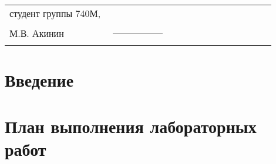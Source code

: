 


\newcommand{\linux}{ОС GNU/Linux}
\newcommand{\virtpo}{VMWare}

\newcommand{\first}{10.0.1.128}
\newcommand{\second}{10.0.2.128}
\newcommand{\midethf}{eth0}
\newcommand{\mideths}{eth1}
\newcommand{\midf}{10.0.1.1}
\newcommand{\mids}{10.0.2.1}

\newcommand{\mytitle}{<<Курс лабораторных работ\\по дисциплине <<Вычислительные сети>>\\для ОС GNU/Linux>>}
\newcommand{\tfirst}{Настройка подключения вычислительной системы к локальной вычислительной сети}
\newcommand{\tsecond}{Протоколы транспортного уровня стека протоколов TCP/IP}
\newcommand{\tthird}{Протоколы сетевого уровня стека протоколов TCP/IP}
\newcommand{\tfourth}{Перехват сетевого трафика. Межсетевой экран netfilter}




\frontmatter

	

	\Executors		%

		\begin{longtable}{p{0.35\linewidth}p{0.2\linewidth}p{0.35\linewidth}}
		студент группы 740М, & & \\
		М.В. Акинин & \rule{1\linewidth}{0.1pt}& \\
		\end{longtable}

	\tableofcontents


\mainmatter

	\chapter{Введение}

		

	\chapter{План выполнения лабораторных работ}

